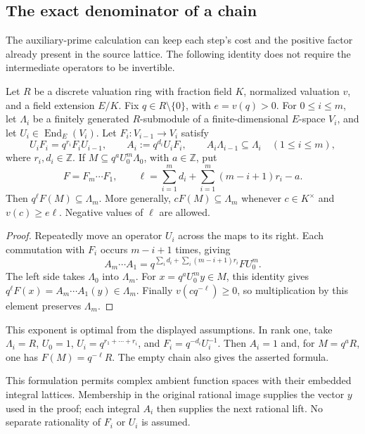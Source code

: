 \subsection{The exact denominator of a chain}
\label{shared-level-chain}

The auxiliary-prime calculation can keep each step's cost and the
positive factor already present in the source lattice.  The following
identity does not require the intermediate operators to be invertible.

\begin{proposition}\label{shared-level-chain-integrality}
Let $R$ be a discrete valuation ring with fraction field $K$, normalized
valuation $v$, and a field extension $E/K$.
Fix $q\in R\setminus\{0\}$, with $e=v(q)>0$.
For $0\le i\le m$, let $\Lambda_i$ be a finitely generated
$R$-submodule of a finite-dimensional $E$-space $V_i$, and let
$U_i\in\operatorname{End}_E(V_i)$.
Let $F_i:V_{i-1}\to V_i$ satisfy
\[
 U_iF_i=q^{r_i}F_iU_{i-1},\qquad
 A_i:=q^{d_i}U_iF_i,\qquad A_i\Lambda_{i-1}\subseteq\Lambda_i
 \quad(1\le i\le m),
\]
where $r_i,d_i\in\mathbb Z$.  If
$M\subseteq q^aU_0^m\Lambda_0$, with $a\in\mathbb Z$, put
\[
 F=F_m\cdots F_1,\qquad
 \ell=\sum_{i=1}^m d_i+
           \sum_{i=1}^m(m-i+1)r_i-a.
\]
Then $q^\ell F(M)\subseteq\Lambda_m$.  More generally,
$cF(M)\subseteq\Lambda_m$ whenever $c\in K^\times$ and
$v(c)\ge e\ell$.  Negative values of $\ell$ are allowed.
\end{proposition}
\begin{proof}
Repeatedly move an operator $U_i$ across the maps to its right.  Each
commutation with $F_i$ occurs $m-i+1$ times, giving
\[
 A_m\cdots A_1
 =q^{\sum_i d_i+\sum_i(m-i+1)r_i}F U_0^m.
\]
The left side takes $\Lambda_0$ into $\Lambda_m$.  For
$x=q^aU_0^my\in M$, this identity gives
$q^\ell F(x)=A_m\cdots A_1(y)\in\Lambda_m$.
Finally $v(cq^{-\ell})\ge0$, so multiplication by this element
preserves $\Lambda_m$.
\end{proof}

This exponent is optimal from the displayed assumptions.  In rank one,
take $\Lambda_i=R$, $U_0=1$,
$U_i=q^{r_1+\cdots+r_i}$, and $F_i=q^{-d_i}U_i^{-1}$.
Then $A_i=1$ and, for $M=q^aR$, one has
$F(M)=q^{-\ell}R$.  The empty chain also gives the asserted formula.

This formulation permits complex ambient function spaces with their
embedded integral lattices. Membership in the original rational image
supplies the vector $y$ used in the proof; each integral $A_i$ then
supplies the next rational lift. No separate rationality of $F_i$ or
$U_i$ is assumed.

